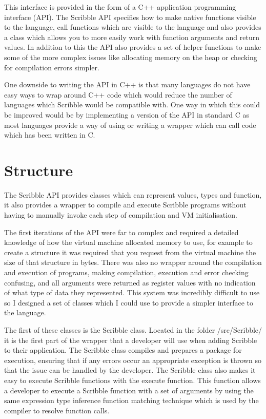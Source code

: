 \documentclass[]{final_report}
\begin{document}
This interface is provided in the form of a C++ application programming interface (API). The Scribble API specifies how to make native functions visible to the language, call functions which are visible to the language and also provides a class which allows you to more easily work with function arguments and return values. In addition to this the API also provides a set of helper functions to make some of the more complex issues like allocating memory on the heap or checking for compilation errors simpler.

One downside to writing the API in C++ is that many languages do not have easy ways to wrap around C++ code which would reduce the number of languages which Scribble would be compatible with. One way in which this could be improved would be by implementing a version of the API in standard C as most languages provide a way of using or writing a wrapper which can call code which has been written in C.

\section{Structure}

The Scribble API provides classes which can represent values, types and function, it also provides a wrapper to compile and execute Scribble programs without having to manually invoke each step of compilation and VM initialisation.

The first iterations of the API were far to complex and required a detailed knowledge of how the virtual machine allocated memory to use, for example to create a structure it was required that you request from the virtual machine the size of that structure in bytes. There was also no wrapper around the compilation and execution of programs, making compilation, execution and error checking confusing, and all arguments were returned as register values with no indication of what type of data they represented. This system was incredibly difficult to use so I designed a set of classes which I could use to provide a simpler interface to the language.

The first of these classes is the Scribble class. Located in the folder /src/Scribble/ it is the first part of the wrapper that a developer will use when adding Scribble to their application. The Scribble class compiles and prepares a package for execution, ensuring that if any errors occur an appropriate exception is thrown so that the issue can be handled by the developer. The Scribble class also makes it easy to execute Scribble functions with the execute function. This function allows a developer to execute a Scribble function with a set of arguments by using the same expression type inference function matching technique which is used by the compiler to resolve function calls.
\end{document}
